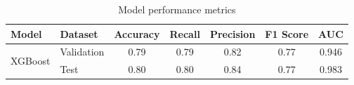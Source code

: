 \begin{table}[h]
\centering
\begin{tabular}{llccccc}
\hline
\textbf{Model} & \textbf{Dataset} & \textbf{Accuracy} & \textbf{Recall} & \textbf{Precision} & \textbf{F1 Score} & \textbf{AUC} \\
\hline
\multirow{2}{*}{XGBoost} & Validation & 0.79 & 0.79 & 0.82 & 0.77 & 0.946 \\
                         & Test       & 0.80 & 0.80 & 0.84 & 0.77 & 0.983 \\
\hline
\end{tabular}
\caption{Model performance metrics}
\label{tab:results}
\end{table}
